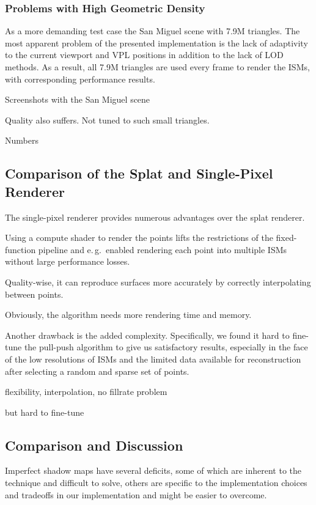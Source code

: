  \subsubsection{Problems with High Geometric Density}

 As a more demanding test case the San Miguel scene with 7.9M triangles. The most apparent problem of the presented implementation is the lack of adaptivity to the current viewport and VPL positions in addition to the lack of LOD methods. As a result, all 7.9M triangles are used every frame to render the ISMs, with corresponding performance results.

 Screenshots with the San Miguel scene

 Quality also suffers. Not tuned to such small triangles.

 Numbers


 \subsection {Comparison of the Splat and Single-Pixel Renderer}

 The single-pixel renderer provides numerous advantages over the splat renderer.

 Using a compute shader to render the points lifts the restrictions of the fixed-function pipeline and e.\,g.\ enabled rendering each point into multiple ISMs without large performance losses.

 Quality-wise, it can reproduce surfaces more accurately by correctly interpolating between points.

 Obviously, the algorithm needs more rendering time and memory.



 Another drawback is the added complexity. Specifically, we found it hard to fine-tune the pull-push algorithm to give us satisfactory results, especially in the face of the low resolutions of ISMs and the limited data available for reconstruction after selecting a random and sparse set of points.

 flexibility, interpolation, no fillrate problem

 but hard to fine-tune



 \subsection{Comparison and Discussion}


 Imperfect shadow maps have several deficits, some of which are inherent to the technique and difficult to solve, others are specific to the implementation choices and tradeoffs in our implementation and might be easier to overcome.

